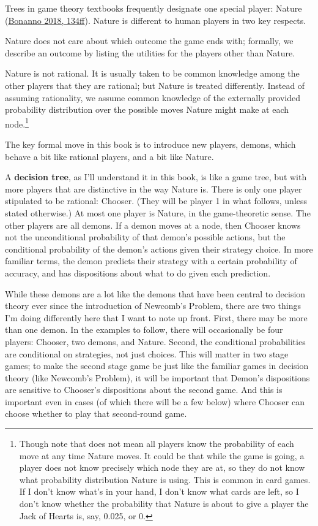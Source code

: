 \documentclass[
  12pt,
  letterpaper,
  DIV=11,
  numbers=noendperiod]{scrreprt}
\begin{document}
Trees in game theory textbooks frequently designate one special player:
Nature (\protect\hyperlink{ref-Bonanno2018}{Bonanno 2018, 134ff}).
Nature is different to human players in two key respects.

Nature does not care about which outcome the game ends with; formally,
we describe an outcome by listing the utilities for the players other
than Nature.

Nature is not rational. It is usually taken to be common knowledge among
the other players that they are rational; but Nature is treated
differently. Instead of assuming rationality, we assume common knowledge
of the externally provided probability distribution over the possible
moves Nature might make at each node.\footnote{Though note that does not
  mean all players know the probability of each move at any time Nature
  moves. It could be that while the game is going, a player does not
  know precisely which node they are at, so they do not know what
  probability distribution Nature is using. This is common in card
  games. If I don't know what's in your hand, I don't know what cards
  are left, so I don't know whether the probability that Nature is about
  to give a player the Jack of Hearts is, say, 0.025, or 0.}

The key formal move in this book is to introduce new players, demons,
which behave a bit like rational players, and a bit like Nature.

A \textbf{decision tree}, as I'll understand it in this book, is like a
game tree, but with more players that are distinctive in the way Nature
is. There is only one player stipulated to be rational: Chooser. (They
will be player 1 in what follows, unless stated otherwise.) At most one
player is Nature, in the game-theoretic sense. The other players are all
demons. If a demon moves at a node, then Chooser knows not the
unconditional probability of that demon's possible actions, but the
conditional probability of the demon's actions given their strategy
choice. In more familiar terms, the demon predicts their strategy with a
certain probability of accuracy, and has dispositions about what to do
given each prediction.

While these demons are a lot like the demons that have been central to
decision theory ever since the introduction of Newcomb's Problem, there
are two things I'm doing differently here that I want to note up front.
First, there may be more than one demon. In the examples to follow,
there will occasionally be four players: Chooser, two demons, and
Nature. Second, the conditional probabilities are conditional on
strategies, not just choices. This will matter in two stage games; to
make the second stage game be just like the familiar games in decision
theory (like Newcomb's Problem), it will be important that Demon's
dispositions are sensitive to Chooser's dispositions about the second
game. And this is important even in cases (of which there will be a few
below) where Chooser can choose whether to play that second-round game.
\end{document}

